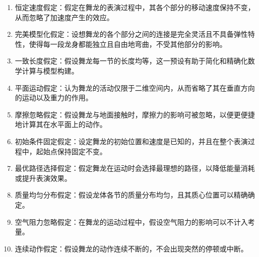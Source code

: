\begin{enumerate}[label=\textbf{\arabic*.}]
	
	\item 恒定速度假定：假定在舞龙的表演过程中，其各个部分的移动速度保持不变，从而忽略了加速度产生的效应。
	
	\item 完美模型化假定：设想舞龙的各个部分之间的连接是完全灵活且不具备弹性特性，使得每一段龙身都能独立且自由地弯曲，不受其他部分的影响。
	
	\item 一致长度假定：假设舞龙每一节的长度均等，这一预设有助于简化和精确化数学计算与模型构建。
	
	\item 平面运动假定：认为舞龙的活动仅限于二维空间内，从而省略了其在垂直方向的运动以及重力的作用。
	
	\item 摩擦忽略假定：假设舞龙与地面接触时，摩擦力的影响可被忽略，以便更便捷地计算其在水平面上的动作。
	
	\item 初始条件固定假定：设定舞龙的初始位置和速度是已知的，并且在整个表演过程中，起始点保持固定不变。
	
	\item  最优路径选择假定：假定舞龙在运动时会选择最理想的路径，以降低能量消耗或提升表演效果。
	
	\item 质量均匀分布假定：假设龙体各节的质量分布均匀，且其质心位置可以精确确定。
	
	\item 空气阻力忽略假定：在舞龙的运动过程中，假设空气阻力的影响可以不计入考量。
	
	\item 连续动作假定：假设舞龙的动作连续不断的，不会出现突然的停顿或中断。
	
	
	
	
	
\end{enumerate}

